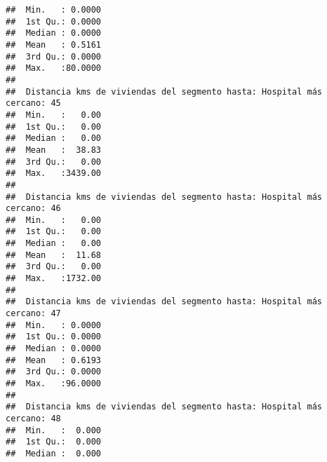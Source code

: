 \documentclass[11pt,]{article}
\begin{document}
\begin{verbatim}
##  Min.   : 0.0000                                                        
##  1st Qu.: 0.0000                                                        
##  Median : 0.0000                                                        
##  Mean   : 0.5161                                                        
##  3rd Qu.: 0.0000                                                        
##  Max.   :80.0000                                                        
##                                                                         
##  Distancia kms de viviendas del segmento hasta: Hospital más cercano: 45
##  Min.   :   0.00                                                        
##  1st Qu.:   0.00                                                        
##  Median :   0.00                                                        
##  Mean   :  38.83                                                        
##  3rd Qu.:   0.00                                                        
##  Max.   :3439.00                                                        
##                                                                         
##  Distancia kms de viviendas del segmento hasta: Hospital más cercano: 46
##  Min.   :   0.00                                                        
##  1st Qu.:   0.00                                                        
##  Median :   0.00                                                        
##  Mean   :  11.68                                                        
##  3rd Qu.:   0.00                                                        
##  Max.   :1732.00                                                        
##                                                                         
##  Distancia kms de viviendas del segmento hasta: Hospital más cercano: 47
##  Min.   : 0.0000                                                        
##  1st Qu.: 0.0000                                                        
##  Median : 0.0000                                                        
##  Mean   : 0.6193                                                        
##  3rd Qu.: 0.0000                                                        
##  Max.   :96.0000                                                        
##                                                                         
##  Distancia kms de viviendas del segmento hasta: Hospital más cercano: 48
##  Min.   :  0.000                                                        
##  1st Qu.:  0.000                                                        
##  Median :  0.000                                                        

\end{verbatim}
\end{document}
